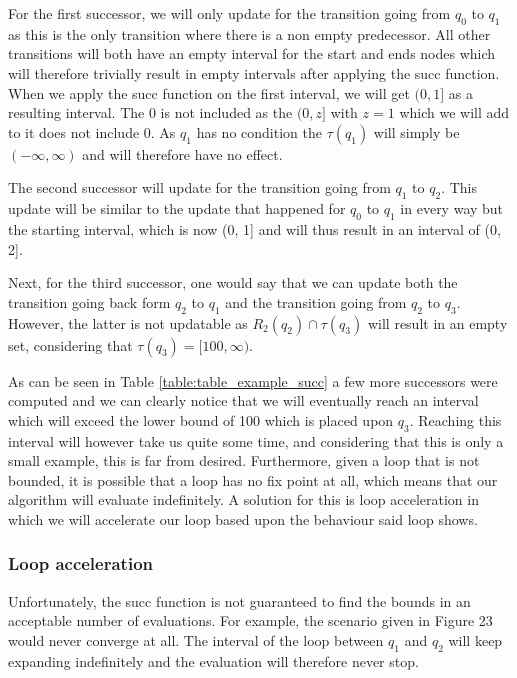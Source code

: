 \documentclass[12pt]{article}
\begin{document}
For the first successor, we will only update for the transition going from $q_0$ to $q_1$ as this is the only transition where there is a non empty predecessor. All other transitions will both have an empty interval for the start and ends nodes which will therefore trivially result in empty intervals after applying the succ function. When we apply the succ function on the first interval, we will get $(0, 1]$ as a resulting interval. The 0 is not included as the $(0,z]$ with $z=1$ which we will add to it does not include 0. As $q_1$ has no condition the $\tau(q_1)$ will simply be $(-\infty, \infty)$ and will therefore have no effect.

The second successor will update for the transition going from $q_1$ to $q_2$. This update will be similar to the update that happened for $q_0$ to $q_1$ in every way but the starting interval, which is now (0, 1] and will thus result in an interval of (0, 2].

Next, for the third successor, one would say that we can update both the transition going back form $q_2$ to $q_1$ and the transition going from $q_2$ to $q_3$. However, the latter is not updatable as $R_2(q_2) \cap \tau(q_3)$ will result in an empty set, considering that $\tau(q_3) = [100, \infty)$.

As can be seen in Table \ref{table:table_example_succ} a few more successors were computed and we can clearly notice that we will eventually reach an interval which will exceed the lower bound of 100 which is placed upon $q_3$. Reaching this interval will however take us quite some time, and considering that this is only a small example, this is far from desired. Furthermore, given a loop that is not bounded, it is possible that a loop has no fix point at all, which means that our algorithm will evaluate indefinitely. A solution for this is loop acceleration in which we will accelerate our loop based upon the behaviour said loop shows. 

\subsubsection{Loop acceleration}

Unfortunately, the succ function is not guaranteed to find the bounds in an acceptable number of evaluations. For example, the scenario given in Figure 23 would never converge at all. The interval of the loop between $q_1$ and $q_2$ will keep expanding indefinitely and the evaluation will therefore never stop.
\end{document}
